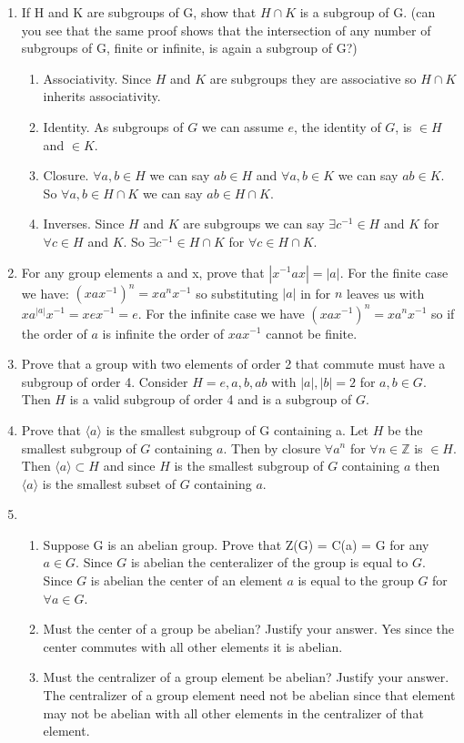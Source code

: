 \documentclass{article}
\begin{document}

\begin{enumerate}

\item 
If H and K are subgroups of G, show that $H\cap K$ is a subgroup of G. (can you see that the same proof
shows that the intersection of any number of subgroups of G, finite or infinite, is again a subgroup of
G?)
	\begin{enumerate}
	\item Associativity. Since $H$ and $K$ are subgroups they are associative so $H\cap K$ inherits associativity.
	\item Identity. As subgroups of $G$ we can assume $e$, the identity of $G$, is $\in H$ and $\in K$.
	\item Closure. $\forall a,b \in H$ we can say $ab \in H$ and $\forall a,b \in K$ we can say $ab \in K$. So $\forall a,b \in H\cap K$ we can say $ab \in H\cap K$.
	\item Inverses. Since $H$ and $K$ are subgroups we can say $\exists c^{-1} \in H$ and $K$ for $\forall c \in H$ and $K$. So $\exists c^{-1} \in H \cap K$ for $ \forall c \in H\cap K$.
	\end{enumerate}
\item 
For any group elements a and x, prove that $|x^{-1}ax|= |a|$.
For the finite case we have: $(x a x^{-1})^{n} = x a^{n}x^{-1}$ so substituting $| a |$ in for $n$ leaves us with $x a ^{| a |} x ^{-1} = x e x^{-1} = e$. For the infinite case we have $(x a x^{-1})^{n} = x a^{n}x^{-1}$ so if the order of $a$ is infinite the order of $x a x^{-1}$ cannot be finite. 
\item 
Prove that a group with two elements of order 2 that commute must have a subgroup of order 4.
Consider $H = {e,a,b,ab}$ with $|a|, |b| = 2$ for $a,b \in G$. Then $H$ is a valid subgroup of order 4 and is a subgroup of $G$.
\item 
Prove that $\langle a \rangle$ is the smallest subgroup of G containing a.
Let $H$ be the smallest subgroup of $G$ containing $a$. Then by closure $\forall a^{n}$ for $\forall n \in \mathbb{Z}$ is $\in H$. Then $\langle a \rangle \subset H$ and since $H$ is the smallest subgroup of $G$ containing $a$ then $\langle a \rangle$ is the smallest subset of $G$ containing $a$. 
\item
	\begin{enumerate}
	\item Suppose G is an abelian group. Prove that Z(G) = C(a) = G for any $a \in G$. Since $G$ is abelian the centeralizer of the group is equal to $G$. Since $G$ is abelian the center of an element $a$ is equal to the group $G$ for $\forall a \in G$.
	\item  Must the center of a group be abelian? Justify your answer.
Yes since the center commutes with all other elements it is abelian.
	\item Must the centralizer of a group element be abelian? Justify your answer.
The centralizer of a group element need not be abelian since that element may not be abelian with all other elements in the centralizer of that element. 
	\end{enumerate}
\end{enumerate}
\end{document}
